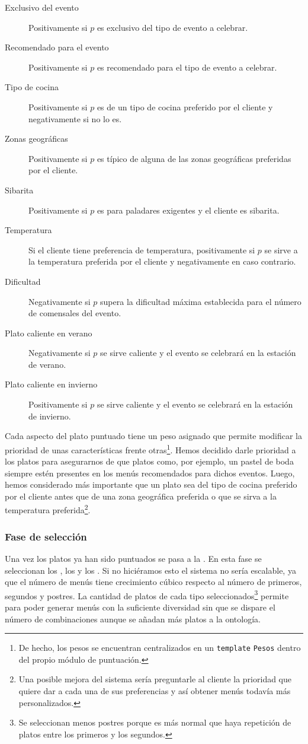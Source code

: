 \begin{description}
\item[Exclusivo del evento] Positivamente si $p$ es exclusivo del tipo de evento a celebrar.
\item[Recomendado para el evento] Positivamente si $p$ es recomendado para el tipo de evento a celebrar.
\item[Tipo de cocina] Positivamente si $p$ es de un tipo de cocina preferido por el cliente y negativamente si no lo es.
\item[Zonas geográficas] Positivamente si $p$ es típico de alguna de las zonas geográficas preferidas por el cliente.
\item[Sibarita] Positivamente si $p$ es para paladares exigentes y el cliente es sibarita.
\item[Temperatura] Si el cliente tiene preferencia de temperatura, positivamente si $p$ se sirve a la temperatura preferida por el cliente
y negativamente en caso contrario.
\item[Dificultad] Negativamente si $p$ supera la dificultad máxima establecida para el número de comensales del evento.
\item[Plato caliente en verano] Negativamente si $p$ se sirve caliente y el evento se celebrará en la estación de verano.
\item[Plato caliente en invierno] Positivamente si $p$ se sirve caliente y el evento se celebrará en la estación de invierno.
\end{description}

Cada aspecto del plato puntuado tiene un peso asignado que permite modificar la prioridad de unas características frente 
otras\footnote{De hecho, los pesos se encuentran centralizados en un \texttt{template} \texttt{Pesos} dentro del propio módulo de
puntuación.}. Hemos decidido darle prioridad a los platos  para asegurarnos de que platos como, por 
ejemplo, un pastel de boda siempre estén presentes en los menús recomendados para dichos eventos. Luego, hemos considerado más
importante que un plato sea del tipo de cocina preferido por el cliente antes que de una zona geográfica preferida o que se sirva a la
temperatura preferida\footnote{Una posible mejora del sistema sería preguntarle al cliente la prioridad que quiere dar a cada una de
sus preferencias y así obtener menús todavía más personalizados.}.

\subsubsection{Fase de selección}
Una vez los platos ya han sido puntuados se pasa a la . En esta fase se seleccionan los
, los  y los . Si no hiciéramos esto el
sistema no sería escalable, ya que el número de menús tiene crecimiento cúbico respecto al número de primeros, segundos y postres.
La cantidad de platos de cada tipo seleccionados\footnote{Se seleccionan menos postres porque es más normal que haya repetición de platos entre los primeros y los segundos.} permite para poder generar menús con la suficiente diversidad sin que se dispare
el número de combinaciones aunque se añadan más platos a la ontología.
